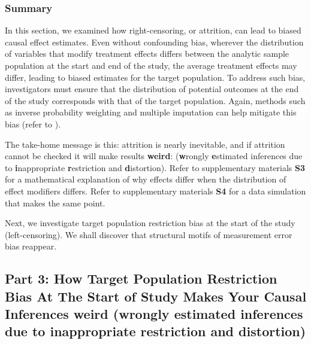 \documentclass[
  single column]{article}
\begin{document}
\subsubsection{Summary}\label{summary-1}

In this section, we examined how right-censoring, or attrition, can lead
to biased causal effect estimates. Even without confounding bias,
wherever the distribution of variables that modify treatment effects
differs between the analytic sample population at the start and end of
the study, the average treatment effects may differ, leading to biased
estimates for the target population. To address such bias, investigators
must ensure that the distribution of potential outcomes at the end of
the study corresponds with that of the target population. Again, methods
such as inverse probability weighting and multiple imputation can help
mitigate this bias (refer to
).

The take-home message is this: attrition is nearly inevitable, and if
attrition cannot be checked it will make results \textbf{weird}:
(\textbf{w}rongly \textbf{e}stimated inferences due to
\textbf{i}nappropriate \textbf{r}estriction and \textbf{d}istortion).
Refer to supplementary materials \textbf{S3} for a mathematical
explanation of why effects differ when the distribution of effect
modifiers differs. Refer to supplementary materials \textbf{S4} for a
data simulation that makes the same point.

Next, we investigate target population restriction bias at the start of
the study (left-censoring). We shall discover that structural motifs of
measurement error bias reappear.

\newpage{}

\subsection{\texorpdfstring{Part 3: How Target Population Restriction
Bias At The Start of Study Makes Your Causal Inferences weird
(\textbf{w}rongly \textbf{e}stimated inferences due to
\textbf{i}nappropriate \textbf{r}estriction and
\textbf{d}istortion)}{Part 3: How Target Population Restriction Bias At The Start of Study Makes Your Causal Inferences weird (wrongly estimated inferences due to inappropriate restriction and distortion)}}\label{id-sec-3}
\end{document}
